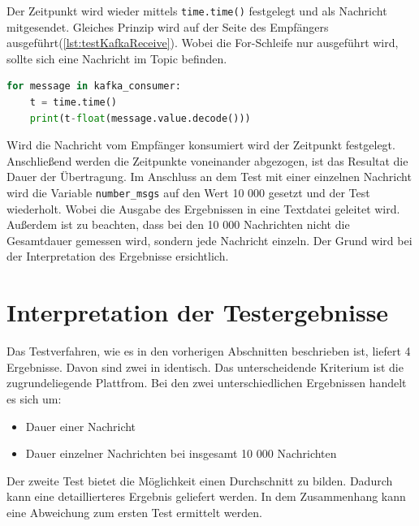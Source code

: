 \documentclass[a4paper,titlepage,halfparskip,12pt]{scrreprt}
\begin{document}
\begin{onehalfspacing}
Der Zeitpunkt wird wieder mittels \texttt{time.time()} festgelegt und als Nachricht mitgesendet. Gleiches Prinzip wird auf der Seite des Empfängers ausgeführt(\autoref{lst:testKafkaReceive}). Wobei die For-Schleife nur ausgeführt wird, sollte sich eine Nachricht im Topic befinden. 
\begin{lstlisting}[language=python, caption={Empfangvorgang der Testnachricht unter Kafka}, label={lst:testKafkaReceive}]
for message in kafka_consumer:
	t = time.time()
	print(t-float(message.value.decode()))
\end{lstlisting}
Wird die Nachricht vom Empfänger konsumiert wird der Zeitpunkt festgelegt. Anschließend werden die Zeitpunkte voneinander abgezogen, ist das Resultat die Dauer der Übertragung. Im Anschluss an dem Test mit einer einzelnen Nachricht wird die Variable \texttt{number\_msgs} auf den Wert 10 000 gesetzt und der Test wiederholt. Wobei die Ausgabe des Ergebnissen in eine Textdatei geleitet wird. Außerdem ist zu beachten, dass bei den 10 000 Nachrichten nicht die Gesamtdauer gemessen wird, sondern jede Nachricht einzeln. Der Grund wird bei der Interpretation des Ergebnisse ersichtlich. 
\pagebreak

\section{Interpretation der Testergebnisse}
\label{sec:Testergebnis}
Das Testverfahren, wie es in den vorherigen Abschnitten beschrieben ist, liefert 4 Ergebnisse. Davon sind zwei in identisch. Das unterscheidende Kriterium ist die zugrundeliegende Plattfrom. Bei den zwei unterschiedlichen Ergebnissen handelt es sich um:
\begin{itemize}
	\item Dauer einer Nachricht
	\item Dauer einzelner Nachrichten bei insgesamt 10 000 Nachrichten
\end{itemize}
Der zweite Test bietet die Möglichkeit einen Durchschnitt zu bilden. Dadurch kann eine detaillierteres Ergebnis geliefert werden. In dem Zusammenhang kann eine Abweichung zum ersten Test ermittelt werden.


\end{onehalfspacing}
\end{document}
